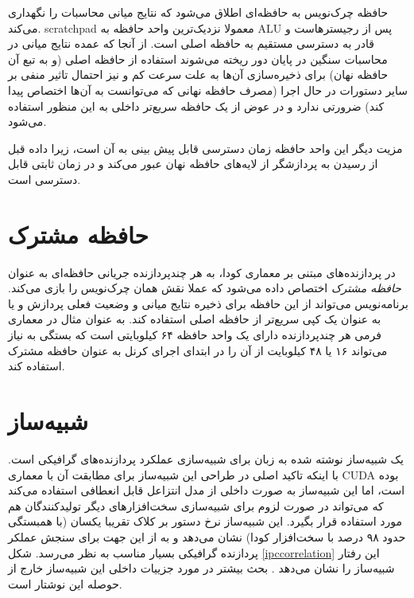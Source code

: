 \documentclass{thesis}
\begin{document}
حافظه چرک‌نویس 
به حافظه‌ای اطلاق می‌شود که نتایج میانی محاسبات را نگهداری می‌کند. 
scratchpad
معمولا نزدیک‌ترین واحد حافظه به
ALU
پس از رجیستر‌هاست و قادر به دسترسی مستقیم به حافظه اصلی
است. از آنجا که عمده نتایج میانی در محاسبات سنگین در پایان دور ریخته می‌شوند
استفاده از حافظه اصلی (و به تبع آن حافظه نهان) برای ذخیره‌سازی آن‌ها به علت
سرعت کم و نیز احتمال تاثیر منفی بر سایر دستورات در حال اجرا
(مصرف حافظه نهانی که می‌توانست به آن‌ها اختصاص پیدا کند) ضرورتی ندارد و در عوض
از یک حافظه سریع‌تر داخلی به این منظور استفاده می‌شود.

مزیت دیگر این واحد حافظه زمان دسترسی قابل پیش بینی به آن است، زیرا داده قبل از
رسیدن به پردازشگر از لایه‌های حافظه نهان عبور می‌کند و در زمان ثابتی قابل
دسترسی است.

\section{
حافظه مشترک
}

در پردازنده‌های مبتنی بر معماری کودا، به هر چندپردازنده‌ جریانی حافظه‌ای به
عنوان
\textit{%
حافظه مشترک
}
اختصاص داده می‌شود که عملا نقش همان چرک‌نویس را بازی می‌کند. برنامه‌نویس
می‌تواند از این حافظه برای ذخیره نتایج میانی و وضعیت فعلی پردازش و یا به عنوان
یک کپی سریع‌تر از حافظه اصلی استفاده کند. به عنوان مثال در معماری فرمی
هر چندپردازنده دارای یک واحد حافظه ۶۴ کیلوبایتی است که بستگی به نیاز می‌تواند
۱۶ یا ۴۸ کیلوبایت از آن را در ابتدای اجرای کرنل به عنوان حافظه مشترک استفاده
کند.

\section{
شبیه‌ساز
}

یک شبیه‌ساز نوشته شده به زبان
برای شبیه‌سازی عملکرد پردازنده‌های گرافیکی 
است. با اینکه تاکید اصلی در طراحی این شبیه‌ساز برای مطابقت آن با معماری
CUDA
بوده است، اما این شبیه‌ساز به صورت داخلی از مدل انتزاعل قابل  انعطافی استفاده
می‌کند
که می‌تواند در صورت لزوم برای شبیه‌سازی سخت‌افزار‌های دیگر تولید‌کنندگان هم
مورد استفاده قرار بگیرد.
این شبیه‌ساز نرخ دستور بر کلاک
تقریبا یکسان
(با همبستگی حدود ۹۸ درصد با سخت‌افزار کودا) نشان می‌دهد و به از این جهت برای
سنجش عملکر پردازنده گرافیکی بسیار مناسب به نظر می‌رسد.
شکل
\ref{ipccorrelation}
این رفتار شبیه‌ساز را نشان می‌دهد
.
 بحث بیشتر در مورد جزییات داخلی این شبیه‌ساز خارج از
حوصله این نوشتار است.
\end{document}
